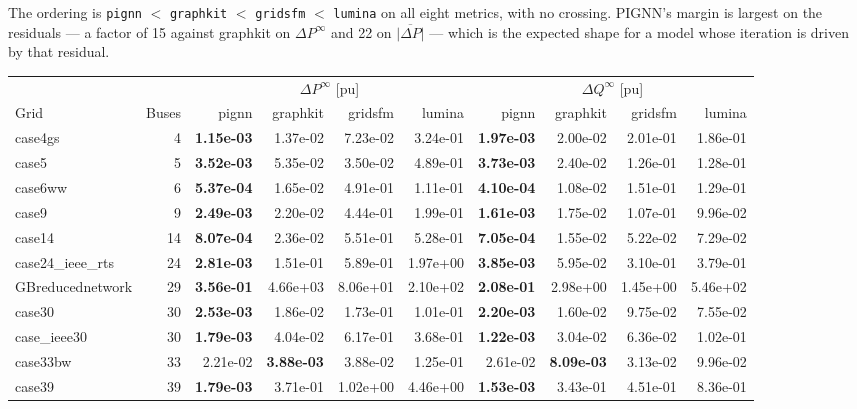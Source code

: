 \documentclass[10pt]{article}
\begin{document}
The ordering is \texttt{pignn} $<$ \texttt{graphkit} $<$ \texttt{gridsfm} $<$
\texttt{lumina} on all eight metrics, with no crossing. PIGNN's margin is
largest on the residuals --- a factor of 15 against graphkit on
$\Delta P^{\infty}$ and 22 on $\overline{|\Delta P|}$ --- which is the expected
shape for a model whose iteration is driven by that residual.

\begin{table}[H]
\centering\small
\begin{tabular}{lr rrrr rrrr}
\toprule
 & & \multicolumn{4}{c}{$\Delta P^{\infty}$ [pu]} & \multicolumn{4}{c}{$\Delta Q^{\infty}$ [pu]} \\
\cmidrule(lr){3-6}\cmidrule(lr){7-10}
Grid & Buses & pignn & graphkit & gridsfm & lumina & pignn & graphkit & gridsfm & lumina \\
\midrule
case4gs & 4 & \textbf{1.15e-03} & 1.37e-02 & 7.23e-02 & 3.24e-01 & \textbf{1.97e-03} & 2.00e-02 & 2.01e-01 & 1.86e-01 \\
case5 & 5 & \textbf{3.52e-03} & 5.35e-02 & 3.50e-02 & 4.89e-01 & \textbf{3.73e-03} & 2.40e-02 & 1.26e-01 & 1.28e-01 \\
case6ww & 6 & \textbf{5.37e-04} & 1.65e-02 & 4.91e-01 & 1.11e-01 & \textbf{4.10e-04} & 1.08e-02 & 1.51e-01 & 1.29e-01 \\
case9 & 9 & \textbf{2.49e-03} & 2.20e-02 & 4.44e-01 & 1.99e-01 & \textbf{1.61e-03} & 1.75e-02 & 1.07e-01 & 9.96e-02 \\
case14 & 14 & \textbf{8.07e-04} & 2.36e-02 & 5.51e-01 & 5.28e-01 & \textbf{7.05e-04} & 1.55e-02 & 5.22e-02 & 7.29e-02 \\
case24\_ieee\_rts & 24 & \textbf{2.81e-03} & 1.51e-01 & 5.89e-01 & 1.97e+00 & \textbf{3.85e-03} & 5.95e-02 & 3.10e-01 & 3.79e-01 \\
GBreducednetwork & 29 & \textbf{3.56e-01} & 4.66e+03 & 8.06e+01 & 2.10e+02 & \textbf{2.08e-01} & 2.98e+00 & 1.45e+00 & 5.46e+02 \\
case30 & 30 & \textbf{2.53e-03} & 1.86e-02 & 1.73e-01 & 1.01e-01 & \textbf{2.20e-03} & 1.60e-02 & 9.75e-02 & 7.55e-02 \\
case\_ieee30 & 30 & \textbf{1.79e-03} & 4.04e-02 & 6.17e-01 & 3.68e-01 & \textbf{1.22e-03} & 3.04e-02 & 6.36e-02 & 1.02e-01 \\
case33bw & 33 & 2.21e-02 & \textbf{3.88e-03} & 3.88e-02 & 1.25e-01 & 2.61e-02 & \textbf{8.09e-03} & 3.13e-02 & 9.96e-02 \\
case39 & 39 & \textbf{1.79e-03} & 3.71e-01 & 1.02e+00 & 4.46e+00 & \textbf{1.53e-03} & 3.43e-01 & 4.51e-01 & 8.36e-01 \\

\end{tabular}
\end{table}
\end{document}
